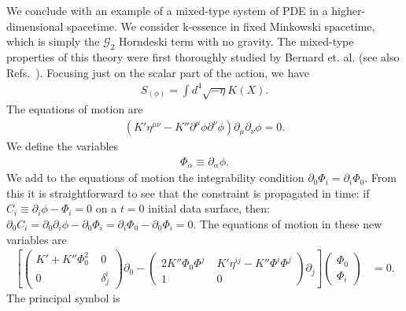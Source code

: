\documentclass{ws-ijmpd}
\begin{document}
We conclude with an example of a mixed-type system of PDE in a
higher-dimensional spacetime.
We consider k-essence in fixed Minkowski 
spacetime\cite{Armendariz-Picon:2000ulo,
Rendall:2005fv,
Armendariz-Picon:2005oog}, which is simply the
$\mathcal{G}_2$ Horndeski term with no gravity.
The mixed-type properties of this theory were first thoroughly studied by
Bernard et. al.\cite{Bernard:2019fjb} 
(see also Refs.~). 
Focusing just on the scalar part of the action, we have
\begin{align}
   S_{(\phi)}
   =
   \int d^4\sqrt{-\eta} K\left(X\right)
   .
\end{align}
The equations of motion are
\begin{align}
   \left(
      K' \eta^{\mu\nu}
      -
      K'' \partial^{\mu}\phi\partial^{\nu}\phi
   \right)
   \partial_{\mu}\partial_{\nu}\phi
   =
   0
   .
\end{align}
We define the variables
\begin{align}
   \Phi_{\alpha}
   \equiv
   \partial_{\alpha}\phi
   .
\end{align}
We add to the equations of motion the integrability condition
$\partial_0\Phi_i = \partial_i\Phi_0$.
From this it is straightforward to see that the constraint is propagated in time:
if $C_i \equiv \partial_i\phi - \Phi_i=0$ on a $t=0$ initial data surface, then:
$\partial_0C_i 
= \partial_0\partial_i\phi - \partial_0\Phi_i
= \partial_i\Phi_0 - \partial_0\Phi_i
=
0
$.
The equations of motion in these new variables are 
\begin{align}
   \left[
      \begin{pmatrix}
         K' 
         +
         K'' \Phi_0^2
         \;
         & 
         0
         \\
         0
         &
         \delta^i_j
      \end{pmatrix}
      \partial_0
      -
      \begin{pmatrix}
         2K'' \Phi_0\Phi^j
         \;
         & 
         K'\eta^{ij}
         -
         K'' \Phi^i\Phi^j
         \\
         1
         &
         0
      \end{pmatrix}
      \partial_j
   \right]
   \begin{pmatrix}
      \Phi_0
      \\
      \Phi_i
   \end{pmatrix}
   &=
   0
   .
\end{align}
The principal symbol is 
\end{document}
